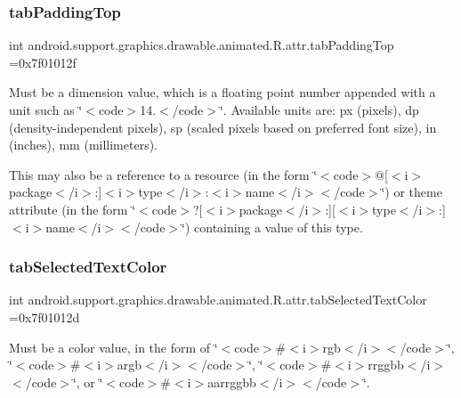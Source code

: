 \subsubsection{\texorpdfstring{tab\+Padding\+Top}{tabPaddingTop}}
{\footnotesize\ttfamily int android.\+support.\+graphics.\+drawable.\+animated.\+R.\+attr.\+tab\+Padding\+Top =0x7f01012f\hspace{0.3cm}{\ttfamily [static]}}

Must be a dimension value, which is a floating point number appended with a unit such as \char`\"{}$<$code$>$14.\+5sp$<$/code$>$\char`\"{}. Available units are\+: px (pixels), dp (density-\/independent pixels), sp (scaled pixels based on preferred font size), in (inches), mm (millimeters). 

This may also be a reference to a resource (in the form \char`\"{}$<$code$>$@\mbox{[}$<$i$>$package$<$/i$>$\+:\mbox{]}$<$i$>$type$<$/i$>$\+:$<$i$>$name$<$/i$>$$<$/code$>$\char`\"{}) or theme attribute (in the form \char`\"{}$<$code$>$?\mbox{[}$<$i$>$package$<$/i$>$\+:\mbox{]}\mbox{[}$<$i$>$type$<$/i$>$\+:\mbox{]}$<$i$>$name$<$/i$>$$<$/code$>$\char`\"{}) containing a value of this type. \mbox{\label{classandroid_1_1support_1_1graphics_1_1drawable_1_1animated_1_1R_1_1attr_afbcb532efe89eda93d1059c02f3f22db}} 
\subsubsection{\texorpdfstring{tab\+Selected\+Text\+Color}{tabSelectedTextColor}}
{\footnotesize\ttfamily int android.\+support.\+graphics.\+drawable.\+animated.\+R.\+attr.\+tab\+Selected\+Text\+Color =0x7f01012d\hspace{0.3cm}{\ttfamily [static]}}

Must be a color value, in the form of \char`\"{}$<$code$>$\#$<$i$>$rgb$<$/i$>$$<$/code$>$\char`\"{}, \char`\"{}$<$code$>$\#$<$i$>$argb$<$/i$>$$<$/code$>$\char`\"{}, \char`\"{}$<$code$>$\#$<$i$>$rrggbb$<$/i$>$$<$/code$>$\char`\"{}, or \char`\"{}$<$code$>$\#$<$i$>$aarrggbb$<$/i$>$$<$/code$>$\char`\"{}. 

